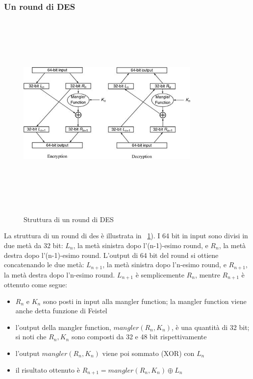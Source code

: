 \subsubsection{Un round di DES}
\begin{figure}[htbp]
	\centering%
	\subfigure%
	{\includegraphics[height=10cm, width=9cm, keepaspectratio]{Immagini/Capitolo2/round_des.png}}
	\caption{Struttura di un round di DES \label{fig:round_des}} 	
\end{figure}
La struttura di un round di des è illustrata in \figurename ~\ref{fig:round_des}). I 64 bit in input sono divisi in due metà da 32 bit: $L_{n}$, la metà sinistra dopo l'(n-1)-esimo round, e $R_{n}$, la metà destra dopo l'(n-1)-esimo round. L'output di 64 bit del round si ottiene concatenando le due metà: $L_{n + 1}$, la metà sinistra dopo l'n-esimo round, e $R_{n + 1}$, la metà destra dopo l'n-esimo round. $L_{n+1}$ è semplicemente $R_{n}$, mentre $R_{n + 1}$ è ottenuto come segue:
\begin{itemize}
  \item $R_{n}$ e $K_{n}$ sono posti in input alla mangler function; la mangler function viene anche detta funzione di Feistel
  \item l'output della mangler function, $mangler(R_{n}, K_{n})$, è una quantità di 32 bit; si noti che $R_{n}, K_{n}$ sono composti da
32 e 48 bit rispettivamente
  \item l'output $mangler(R_{n}, K_{n})$ viene poi sommato (XOR) con $L_{n}$
  \item il risultato ottenuto è $R_{n+1} = mangler(R_{n}, K_{n}) \oplus L_{n}$
\end{itemize}
